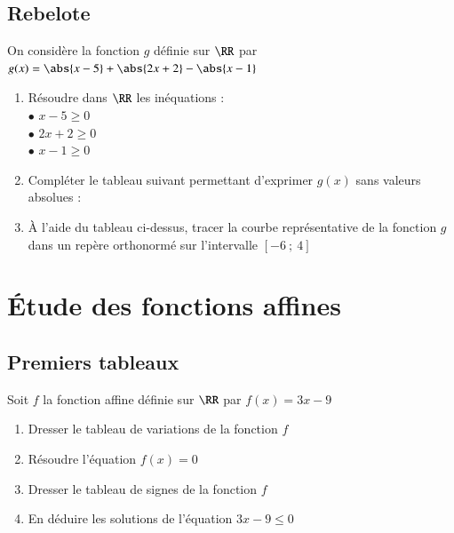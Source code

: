 \documentclass[oneside,12pt]{article}          %
\begin{document}
\subsection{Rebelote}
On considère la fonction $g$ définie sur $\RR$ par $g(x)=\abs{x-5}+\abs{2x+2}-\abs{x-1}$
\begin{enumerate}
	\item Résoudre dans $\RR$ les inéquations : \\
		$\bullet$ $x-5 \geq 0$ \\
		$\bullet$ $2x+2 \geq 0$ \\
		$\bullet$ $x-1 \geq 0$
	\item Compléter le tableau suivant permettant d'exprimer $g(x)$ sans valeurs absolues :
	
	\item À l'aide du tableau ci-dessus, tracer la courbe représentative de la fonction $g$ dans un repère orthonormé sur l'intervalle $[-6~;~4]$
\end{enumerate}



\section{Étude des fonctions affines}

\subsection{Premiers tableaux}
Soit $f$ la fonction affine définie sur $\RR$ par $f(x)=3x-9$
\begin{enumerate}
	\item Dresser le tableau de variations de la fonction $f$
	\item Résoudre l'équation $f(x)=0$
	\item Dresser le tableau de signes de la fonction $f$
	\item En déduire les solutions de l'équation $3x-9\leq0$
\end{enumerate}
\end{document}
